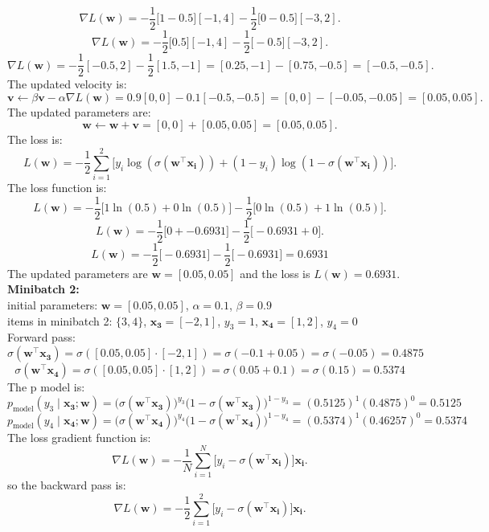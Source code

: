 \documentclass[a3paper,12pt]{article} %
\begin{document}
\[
\nabla L(\mathbf{w}) = -\frac{1}{2} \big[1 - 0.5\big] [-1, 4] - \frac{1}{2} \big[0 - 0.5\big] [-3, 2].
\]
\[
\nabla L(\mathbf{w}) = -\frac{1}{2} \big[0.5] [-1, 4] - \frac{1}{2} \big[-0.5] [-3, 2].
\]
\[
\nabla L(\mathbf{w}) = -\frac{1}{2} [-0.5, 2] - \frac{1}{2} [1.5, -1] = [0.25, -1] - [0.75, -0.5] = [-0.5, -0.5].
\]
The updated velocity is:
\[
\mathbf{v} \gets \beta \mathbf{v} - \alpha \nabla L(\mathbf{w}) = 0.9 [0, 0] - 0.1 [-0.5, -0.5] = [0, 0] - [-0.05, -0.05] = [0.05, 0.05].
\]
The updated parameters are:
\[
\mathbf{w} \gets \mathbf{w} + \mathbf{v} = [0, 0] + [0.05, 0.05] = [0.05, 0.05].
\]
The loss is:
\[
L(\mathbf{w}) = -\frac{1}{2} \sum^2_{i=1} \big[y_i \log(\sigma(\mathbf{w}^\top \mathbf{x_i})) + (1-y_i) \log(1-\sigma(\mathbf{w}^\top \mathbf{x_i}))\big].
\]
The loss function is:
\[
L(\mathbf{w}) = -\frac{1}{2} \big[1 \ln(0.5) + 0 \ln(0.5)\big] - \frac{1}{2} \big[0 \ln(0.5) + 1 \ln(0.5)\big].
\]
\[
L(\mathbf{w}) = -\frac{1}{2} \big[0 + -0.6931\big] - \frac{1}{2} \big[-0.6931 + 0\big].
\]
\[
L(\mathbf{w}) = -\frac{1}{2} \big[-0.6931\big] - \frac{1}{2} \big[-0.6931\big] = 0.6931
\]
The updated parameters are \(\mathbf{w} = \mathbf{[0.05, 0.05]}\) and the loss is \(L(\mathbf{w}) = \mathbf{0.6931}\).
\\ \textbf{Minibatch 2:}
\\ initial parameters: \(\mathbf{w} = [0.05, 0.05]\), \(\alpha = 0.1\), \(\beta = 0.9\)
\\ items in minibatch 2: \(\{3, 4\}\), \(\mathbf{x_3} = [-2, 1]\), \(y_3 = 1\), \(\mathbf{x_4} = [1, 2]\), \(y_4 = 0\)
\\ Forward pass:
\[
\sigma(\mathbf{w}^\top \mathbf{x_3}) = \sigma([0.05, 0.05] \cdot [-2, 1]) = \sigma(-0.1 + 0.05) = \sigma(-0.05) = 0.4875
\]
\[
\sigma(\mathbf{w}^\top \mathbf{x_4}) = \sigma([0.05, 0.05] \cdot [1, 2]) = \sigma(0.05 + 0.1) = \sigma(0.15) = 0.5374
\]
The p model is:
\[
p_{\text{model}}(y_3 \mid \mathbf{x_3}; \mathbf{w}) = \big(\sigma(\mathbf{w}^\top \mathbf{x_3})\big)^{y_3} \big(1 - \sigma(\mathbf{w}^\top \mathbf{x_3})\big)^{1-y_3} = (0.5125)^1 (0.4875)^0 = 0.5125
\]
\[
p_{\text{model}}(y_4 \mid \mathbf{x_4}; \mathbf{w}) = \big(\sigma(\mathbf{w}^\top \mathbf{x_4})\big)^{y_4} \big(1 - \sigma(\mathbf{w}^\top \mathbf{x_4})\big)^{1-y_4} = (0.5374)^1 (0.46257)^0 = 0.5374
\]
The loss gradient function is:
\[
\nabla L(\mathbf{w}) = -\frac{1}{N} \sum^N_{i=1} \big[y_i - \sigma(\mathbf{w}^\top \mathbf{x_i})\big] \mathbf{x_i}.
\]  
so the backward pass is:
\[
\nabla L(\mathbf{w}) = -\frac{1}{2} \sum^2_{i=1} \big[y_i - \sigma(\mathbf{w}^\top \mathbf{x_i})\big] \mathbf{x_i}.
\]
\end{document}
